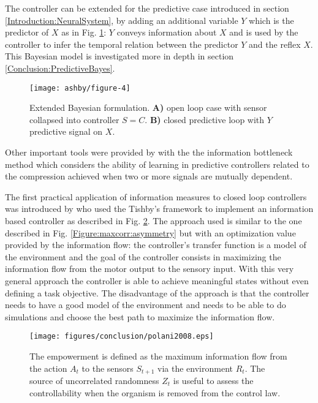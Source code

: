 The controller can be extended for the predictive case introduced in section \ref{Introduction:NeuralSystem},
by adding an additional variable $Y$ which is the predictor of $X$ as in Fig. \ref{fig:tishby2}:
$Y$ conveys information about $X$ and is used by the controller to infer the 
temporal relation between the predictor $Y$ and the reflex $X$.
This Bayesian model is investigated more in depth in section \ref{Conclusion:PredictiveBayes}.
\begin{figure}[!htbp]
\begin{center}
 \texttt{[image: ashby/figure-4]}
\caption[Bayes formulation in predictive control]{
Extended Bayesian formulation.
\textbf{A)} open loop case with sensor collapsed into controller $S=C$.
\textbf{B)} closed predictive loop with $Y$ predictive signal on $X$.
\label{fig:tishby2}}
\end{center}
\end{figure}

Other important tools were provided by \citet{Tishby1999:InfoBottle} with the 
the information bottleneck method which considers the ability of learning 
in predictive controllers related to the compression achieved when two or more
signals are mutually dependent.

The first practical application of information measures to closed loop controllers
was introduced by \citet{organizationInfo} who used the Tishby's framework
to implement an information based controller as described in Fig. \ref{fig:conclusion:polani}.
The approach used is similar to the one described in Fig. \ref{Figure:maxcorr:asymmetry} 
but with an optimization value provided by the information flow: the controller's
transfer function is a model of the environment and the goal of the controller
consists in maximizing the information flow from the motor output to the sensory input.
With this very general approach the controller is able to achieve meaningful states
without even defining a task objective.
The disadvantage of the approach is that the controller needs to have a good model
of the environment and needs to be able to do simulations and choose the best
path to maximize the information flow.


\begin{figure}[htbp]
\begin{center}
\texttt{[image: figures/conclusion/polani2008.eps]}
\end{center}
\vspace*{4pt}
\caption[Empowerment from Polani]{
The empowerment is defined as the maximum information flow
from the action $A_{t}$ to the sensors $S_{t+1}$ via the environment $R_{t}$.
The source of uncorrelated randomness $Z_{t}$ is useful to assess the controllability
when the organism is removed from the control law.
\label{fig:conclusion:polani}}
\end{figure}


